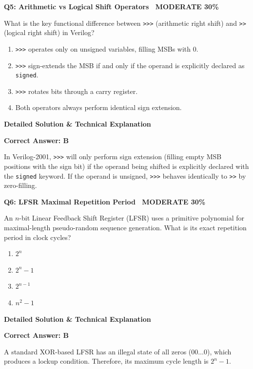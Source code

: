 \documentclass[11pt,a4paper]{article}
\newcommand{\badgemod}{{\color{white}\colorbox{modoran}{\bfseries\sffamily\tiny\ MODERATE 30\%\ }}}
\newenvironment{qbox}[2]{%
  \begin{mdframed}[style=qstyle]%
  {\bfseries\sffamily\color{primaryblue}#1 \hfill #2}\par\vspace{2pt}%
}{%
  \end{mdframed}%
}
\newenvironment{ansbox}{%
  \begin{mdframed}[style=ansstyle]%
  {\bfseries\sffamily\color{ansgreen}\small Detailed Solution \& Technical Explanation}\par\vspace{2pt}\small%
}{%
  \end{mdframed}%
}
\begin{document}
\begin{qbox}{Q5: Arithmetic vs Logical Shift Operators}{\badgemod}
What is the key functional difference between \texttt{>>>} (arithmetic right shift) and \texttt{>>} (logical right shift) in Verilog?
\begin{enumerate}[label=\textbf{\Alph*.}]
  \item \texttt{>>>} operates only on unsigned variables, filling MSBs with 0.
  \item \texttt{>>>} sign-extends the MSB if and only if the operand is explicitly declared as \texttt{signed}.
  \item \texttt{>>>} rotates bits through a carry register.
  \item Both operators always perform identical sign extension.
\end{enumerate}
\end{qbox}
\begin{ansbox}
\textbf{Correct Answer: B}

In Verilog-2001, \texttt{>>>} will only perform sign extension (filling empty MSB positions with the sign bit) if the operand being shifted is explicitly declared with the \texttt{signed} keyword. If the operand is unsigned, \texttt{>>>} behaves identically to \texttt{>>} by zero-filling.
\end{ansbox}

\begin{qbox}{Q6: LFSR Maximal Repetition Period}{\badgemod}
An $n$-bit Linear Feedback Shift Register (LFSR) uses a primitive polynomial for maximal-length pseudo-random sequence generation. What is its exact repetition period in clock cycles?
\begin{enumerate}[label=\textbf{\Alph*.}]
  \item $2^n$
  \item $2^n - 1$
  \item $2^{n-1}$
  \item $n^2 - 1$
\end{enumerate}
\end{qbox}
\begin{ansbox}
\textbf{Correct Answer: B}

A standard XOR-based LFSR has an illegal state of all zeros ($00\dots0$), which produces a lockup condition. Therefore, its maximum cycle length is $2^n - 1$.
\end{ansbox}
\end{document}
